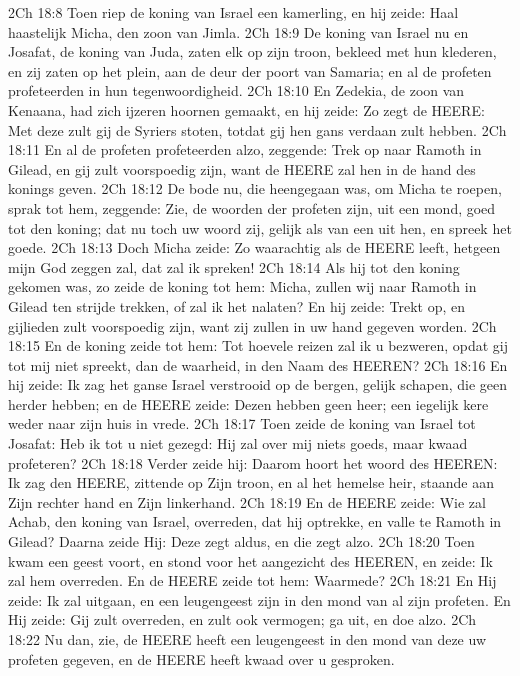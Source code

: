 2Ch 18:8  Toen riep de koning van Israel een kamerling, en hij zeide: Haal haastelijk Micha, den zoon van Jimla.
2Ch 18:9  De koning van Israel nu en Josafat, de koning van Juda, zaten elk op zijn troon, bekleed met hun klederen, en zij zaten op het plein, aan de deur der poort van Samaria; en al de profeten profeteerden in hun tegenwoordigheid.
2Ch 18:10  En Zedekia, de zoon van Kenaana, had zich ijzeren hoornen gemaakt, en hij zeide: Zo zegt de HEERE: Met deze zult gij de Syriers stoten, totdat gij hen gans verdaan zult hebben.
2Ch 18:11  En al de profeten profeteerden alzo, zeggende: Trek op naar Ramoth in Gilead, en gij zult voorspoedig zijn, want de HEERE zal hen in de hand des konings geven.
2Ch 18:12  De bode nu, die heengegaan was, om Micha te roepen, sprak tot hem, zeggende: Zie, de woorden der profeten zijn, uit een mond, goed tot den koning; dat nu toch uw woord zij, gelijk als van een uit hen, en spreek het goede.
2Ch 18:13  Doch Micha zeide: Zo waarachtig als de HEERE leeft, hetgeen mijn God zeggen zal, dat zal ik spreken!
2Ch 18:14  Als hij tot den koning gekomen was, zo zeide de koning tot hem: Micha, zullen wij naar Ramoth in Gilead ten strijde trekken, of zal ik het nalaten? En hij zeide: Trekt op, en gijlieden zult voorspoedig zijn, want zij zullen in uw hand gegeven worden.
2Ch 18:15  En de koning zeide tot hem: Tot hoevele reizen zal ik u bezweren, opdat gij tot mij niet spreekt, dan de waarheid, in den Naam des HEEREN?
2Ch 18:16  En hij zeide: Ik zag het ganse Israel verstrooid op de bergen, gelijk schapen, die geen herder hebben; en de HEERE zeide: Dezen hebben geen heer; een iegelijk kere weder naar zijn huis in vrede.
2Ch 18:17  Toen zeide de koning van Israel tot Josafat: Heb ik tot u niet gezegd: Hij zal over mij niets goeds, maar kwaad profeteren?
2Ch 18:18  Verder zeide hij: Daarom hoort het woord des HEEREN: Ik zag den HEERE, zittende op Zijn troon, en al het hemelse heir, staande aan Zijn rechter hand en Zijn linkerhand.
2Ch 18:19  En de HEERE zeide: Wie zal Achab, den koning van Israel, overreden, dat hij optrekke, en valle te Ramoth in Gilead? Daarna zeide Hij: Deze zegt aldus, en die zegt alzo.
2Ch 18:20  Toen kwam een geest voort, en stond voor het aangezicht des HEEREN, en zeide: Ik zal hem overreden. En de HEERE zeide tot hem: Waarmede?
2Ch 18:21  En Hij zeide: Ik zal uitgaan, en een leugengeest zijn in den mond van al zijn profeten. En Hij zeide: Gij zult overreden, en zult ook vermogen; ga uit, en doe alzo.
2Ch 18:22  Nu dan, zie, de HEERE heeft een leugengeest in den mond van deze uw profeten gegeven, en de HEERE heeft kwaad over u gesproken.
